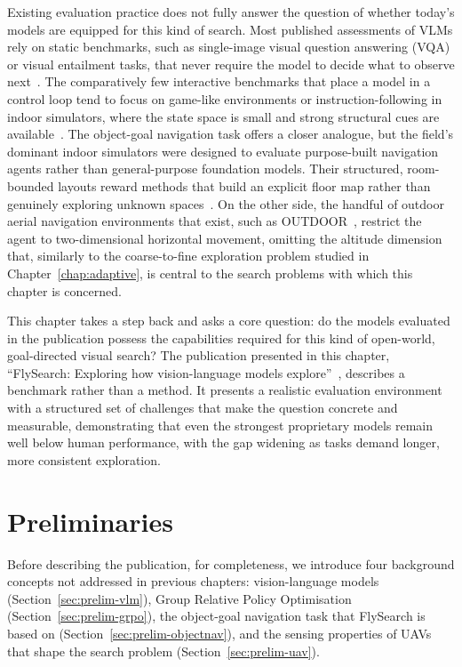 Existing evaluation practice does not fully answer the question of whether today's models are equipped for this kind of search. Most published assessments of VLMs rely on static benchmarks, such as single-image visual question answering (VQA) or visual entailment tasks, that never require the model to decide what to observe next~\cite{goyal2017making,liu2025mmbench}. The comparatively few interactive benchmarks that place a model in a control loop tend to focus on game-like environments or instruction-following in indoor simulators, where the state space is small and strong structural cues are available~\cite{paglieri2024balrog,liu2024visualagentbench}. The object-goal navigation task offers a closer analogue, but the field's dominant indoor simulators were designed to evaluate purpose-built navigation agents rather than general-purpose foundation models. Their structured, room-bounded layouts reward methods that build an explicit floor map rather than genuinely exploring unknown spaces~\cite{savva2019habitat,kolve2017ai2,xia2018gibson}. On the other side, the handful of outdoor aerial navigation environments that exist, such as OUTDOOR~\cite{xie2023reasoning}, restrict the agent to two-dimensional horizontal movement, omitting the altitude dimension that, similarly to the coarse-to-fine exploration problem studied in Chapter~\ref{chap:adaptive}, is central to the search problems with which this chapter is concerned.

This chapter takes a step back and asks a core question: do the models evaluated in the publication possess the capabilities required for this kind of open-world, goal-directed visual search? The publication presented in this chapter, ``FlySearch: Exploring how vision-language models explore''~, describes a benchmark rather than a method. It presents a realistic evaluation environment with a structured set of challenges that make the question concrete and measurable, demonstrating that even the strongest proprietary models remain well below human performance, with the gap widening as tasks demand longer, more consistent exploration.

\section{Preliminaries}
\label{sec:openworld-preliminaries}

Before describing the publication, for completeness, we introduce four background concepts not addressed in previous chapters: vision-language models (Section~\ref{sec:prelim-vlm}), Group Relative Policy Optimisation (Section~\ref{sec:prelim-grpo}), the object-goal navigation task that FlySearch is based on (Section~\ref{sec:prelim-objectnav}), and the sensing properties of UAVs that shape the search problem (Section~\ref{sec:prelim-uav}).


